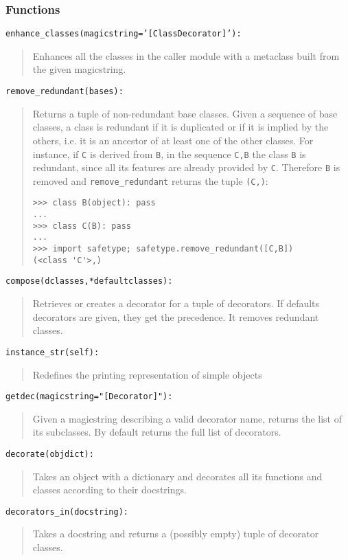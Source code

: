 \documentclass[11pt,english]{article}
\begin{document}

\hypertarget{functions}{}
\subsubsection*{Functions}

\texttt{enhance{\_}classes(magicstring='[ClassDecorator]'):}
\begin{quote}

Enhances all the classes in the caller module with a metaclass
built from the given magicstring.
\end{quote}

\texttt{remove{\_}redundant(bases):}
\begin{quote}

Returns a tuple of non-redundant base classes.
Given a sequence of base classes, a class is redundant if it is duplicated
or if it is implied by the others, i.e. it is an ancestor of at least one
of the other classes. For instance, if \texttt{C} is derived from \texttt{B}, in the
sequence \texttt{C,B} the class \texttt{B} is redundant, since all its features are
already provided by \texttt{C}. Therefore \texttt{B}
is removed and \texttt{remove{\_}redundant} returns the tuple \texttt{(C,)}:
\begin{verbatim}>>> class B(object): pass
...
>>> class C(B): pass
...
>>> import safetype; safetype.remove_redundant([C,B])
(<class 'C'>,)\end{verbatim}
\end{quote}

\texttt{compose(dclasses,*defaultclasses):}
\begin{quote}

Retrieves or creates a decorator for a tuple of decorators. If
defaults decorators are given, they get the precedence. It removes
redundant classes.
\end{quote}

\texttt{instance{\_}str(self):}
\begin{quote}

Redefines the printing representation of simple objects
\end{quote}

\texttt{getdec(magicstring="[Decorator]"):}
\begin{quote}

Given a magicstring describing a valid decorator name, returns the list
of its subclasses. By default returns the full list of decorators.
\end{quote}

\texttt{decorate(objdict):}
\begin{quote}

Takes an object with a dictionary and decorates all its functions
and classes according to their docstrings.
\end{quote}

\texttt{decorators{\_}in(docstring):}
\begin{quote}

Takes a docstring and returns a (possibly empty) tuple of decorator
classes.
\end{quote}
\end{document}
